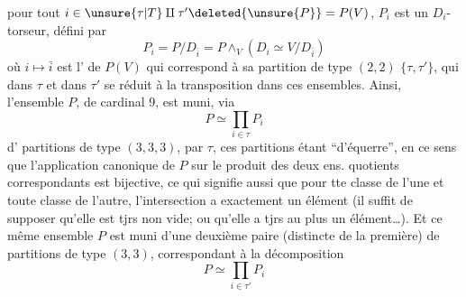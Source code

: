  pour tout $i\in\unsure{\tau|T}\amalg\tau'\deleted{\unsure{P}}=P(V)$, $P_i$ est un $D_i$-torseur, défini par
\[
P_i=P/D_{\bar i}=P\wedge_V(D_i\simeq V/D_{\bar i})
\tag*{(6)}
\]
où $i\mapsto\bar i$ est l' de $P(V)$ qui  correspond à sa partition de type $(2,2)$ $\{\tau,\tau'\}$, qui dans $\tau$ et dans $\tau'$ se réduit à la transposition dans ces ensembles. Ainsi, l'ensemble $P$, de cardinal $9$, est muni, via
\[
P\simeq\prod_{i\in\tau}P_i
\tag*{$(*)$}
\]
d' partitions de type $(3,3,3)$,  par $\tau$, ces partitions étant ``d'équerre'', en ce sens que l'application canonique  de $P$ sur le produit des deux ens. quotients correspondants est bijective, ce qui signifie aussi que pour tte classe de l'une et toute classe de l'autre, l'intersection a exactement un élément (il suffit de supposer qu'elle est tjrs non vide; ou qu'elle a tjrs au plus un élément\ldots). Et ce même ensemble $P$ est muni d'une deuxième paire (distincte de la première) de partitions de type $(3,3)$,  correspondant à la décomposition
\[
P\simeq\prod_{i\in\tau'}P_i
\tag*{$(*')$}
\]

